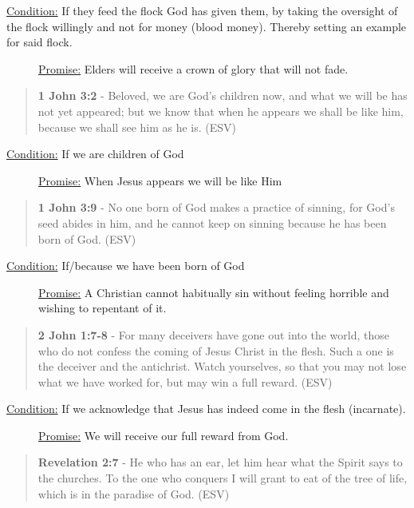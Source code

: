 \documentclass[11pt]{article}
\begin{document}
\begin{description}
\item[{\uline{Condition:} If they feed the flock God has given them, by taking the oversight of the flock willingly and not for money (blood money). Thereby setting an example for said flock.}] \uline{Promise:} Elders will receive a crown of glory that will not fade.
\end{description}

\begin{quote}
\textbf{1 John 3:2} - Beloved, we are God's children now, and what we will be has not yet appeared; but we know that when he appears we shall be like him, because we shall see him as he is. (ESV)
\end{quote}

\begin{description}
\item[{\uline{Condition:} If we are children of God}] \uline{Promise:} When Jesus appears we will be like Him
\end{description}

\begin{quote}
\textbf{1 John 3:9} - No one born of God makes a practice of sinning, for God's seed abides in him, and he cannot keep on sinning because he has been born of God. (ESV)
\end{quote}

\begin{description}
\item[{\uline{Condition:} If/because we have been born of God}] \uline{Promise:} A Christian cannot habitually sin without feeling horrible and wishing to repentant of it.
\end{description}

\begin{quote}
\textbf{2 John 1:7-8} - For many deceivers have gone out into the world, those who do not confess the coming of Jesus Christ in the flesh. Such a one is the deceiver and the antichrist. Watch yourselves, so that you may not lose what we have worked for, but may win a full reward. (ESV)
\end{quote}

\begin{description}
\item[{\uline{Condition:} If we acknowledge that Jesus has indeed come in the flesh (incarnate).}] \uline{Promise:} We will receive our full reward from God.
\end{description}

\begin{quote}
\textbf{Revelation 2:7} - He who has an ear, let him hear what the Spirit says to the churches. To the one who conquers I will grant to eat of the tree of life, which is in the paradise of God. (ESV)
\end{quote}
\end{document}
